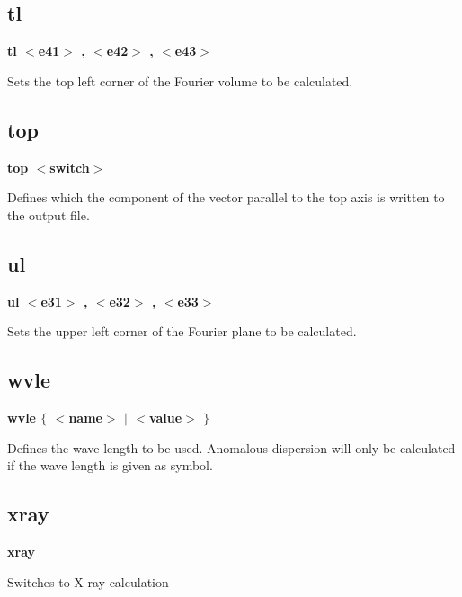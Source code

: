 \subsection*{tl}
{\bf tl $ <$e41$> $ , $ <$e42$> $ , $ <$e43$> $ \par }
\par
\vspace{3pt}
Sets the top   left corner of the Fourier volume to be calculated. 
\subsection*{top}
{\bf top $ <$switch$> $ \par }
\par
\vspace{3pt}
Defines which the component of the vector parallel to the top axis 
is written to the output file. 
\subsection*{ul}
{\bf ul $ <$e31$> $ , $ <$e32$> $ , $ <$e33$> $ \par }
\par
\vspace{3pt}
Sets the upper left corner of the Fourier plane to be calculated. 
\subsection*{wvle}
{\bf wvle $ \{$ $ <$name$> $ $| $ $ <$value$> $ $\} $ \par }
\par
\vspace{3pt}
Defines the wave length to be used. Anomalous dispersion will only 
be calculated if the wave length is given as symbol. 
\subsection*{xray}
{\bf xray \par }
\par
\vspace{3pt}
Switches to X-ray calculation 
